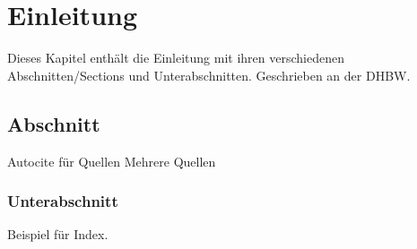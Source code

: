 \chapter{Einleitung}

Dieses Kapitel enthält die Einleitung mit ihren verschiedenen Abschnitten/Sections und
Unterabschnitten. Geschrieben an der \ac{DHBW}.

\section{Abschnitt}

Autocite für Quellen \autocite[Vgl.][S. 42]{ME12}
Mehrere Quellen \cites[Vgl.][S. 10]{ME12}[Vgl.][S. 100]{TD15} 

\subsection{Unterabschnitt}

Beispiel für Index.
\lipsum 
